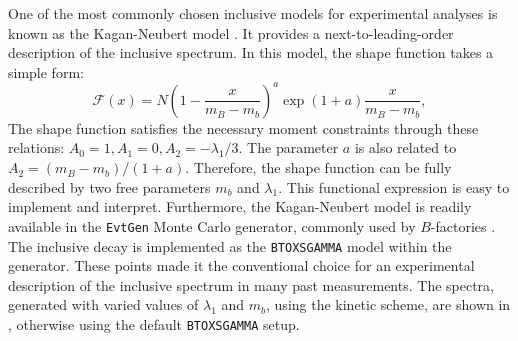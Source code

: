 One of the most commonly chosen inclusive \BtoXsgamma models for experimental analyses is known as the Kagan-Neubert model \cite{Kagan:1998ym}.
It provides a next-to-leading-order description of the inclusive \BtoXsgamma spectrum. 
In this model, the shape function takes a simple form:
\begin{equation}
    \mathcal{F}(x) = N\left(1-\frac{x}{m_B-m_b}\right)^a\exp{(1+a)\frac{x}{m_B-m_b}},
\end{equation}
The shape function satisfies the necessary moment constraints through these relations: $A_0=1,A_1 = 0,A_2=-\lambda_1/3$.
The parameter $a$ is also related to $A_2=(m_B-m_b)/(1+a)$.
Therefore, the shape function can be fully described by two free parameters $m_b$ and $\lambda_1$.
This functional expression is easy to implement and interpret.
Furthermore, the Kagan-Neubert model is readily available in the \texttt{EvtGen} Monte Carlo generator, commonly used by $B$-factories \cite{Ryd:2005zz}.
The \BtoXsgamma inclusive decay is implemented as the \texttt{BTOXSGAMMA} model within the generator. 
These points made it the conventional choice for an experimental description of the inclusive \Egamma spectrum in many past measurements.
The spectra, generated with varied values of $\lambda_1$ and $m_b$, using the kinetic scheme, are shown in , otherwise using the default \texttt{BTOXSGAMMA} setup.
